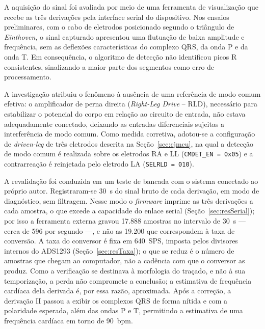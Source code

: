 A aquisição do sinal foi avaliada por meio de uma ferramenta de visualização que recebe as três derivações pela interface serial do dispositivo. Nos ensaios preliminares, com o cabo de eletrodos posicionado segundo o triângulo de \textit{Einthoven}, o sinal capturado apresentou uma flutuação de baixa amplitude e frequência, sem as deflexões características do complexo QRS, da onda P e da onda T. Em consequência, o algoritmo de detecção não identificou picos R consistentes, sinalizando a maior parte dos segmentos como erro de processamento.

A investigação atribuiu o fenômeno à ausência de uma referência de modo comum efetiva: o amplificador de perna direita (\textit{Right-Leg Drive} -- RLD), necessário para estabilizar o potencial do corpo em relação ao circuito de entrada, não estava adequadamente conectado, deixando as entradas diferenciais sujeitas a interferência de modo comum. Como medida corretiva, adotou-se a configuração de \textit{driven-leg} de três eletrodos descrita na Seção~\ref{sec:cjmcu}, na qual a detecção de modo comum é realizada sobre os eletrodos RA e LL (\texttt{CMDET\_EN = 0x05}) e a contrarreação é reinjetada pelo eletrodo LA (\texttt{SELRLD = 010}).

A revalidação foi conduzida em um teste de bancada com o sistema conectado ao próprio autor. Registraram-se 30~s do sinal bruto de cada derivação, em modo de diagnóstico, sem filtragem. Nesse modo o \textit{firmware} imprime as três derivações a cada amostra, o que excede a capacidade do enlace serial (Seção~\ref{sec:resSerial}); por isso a ferramenta externa gravou 17.888 amostras no intervalo de 30~s --- cerca de 596 por segundo ---, e não as 19.200 que correspondem à taxa de conversão. A taxa do conversor é fixa em 640~SPS, imposta pelos divisores internos do ADS1293 (Seção~\ref{sec:resTaxa}); o que se reduz é o número de amostras que chegam ao computador, não a cadência com que o conversor as produz. Como a verificação se destinava à morfologia do traçado, e não à sua temporização, a perda não compromete a conclusão; a estimativa de frequência cardíaca dela derivada é, por essa razão, aproximada. Após a correção, a derivação II passou a exibir os complexos QRS de forma nítida e com a polaridade esperada, além das ondas P e T, permitindo a estimativa de uma frequência cardíaca em torno de 90~bpm.


